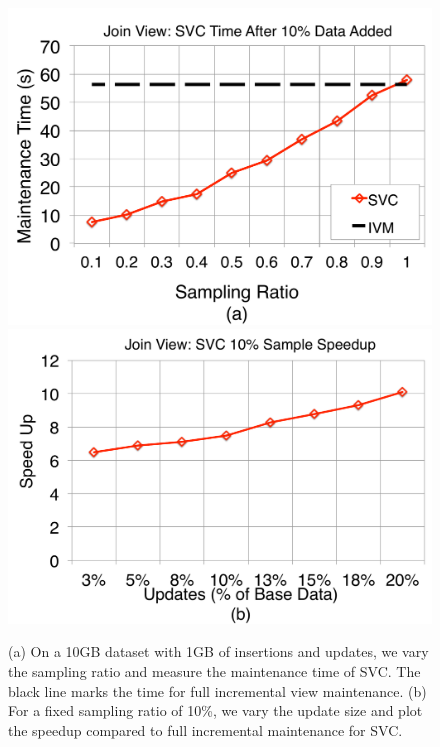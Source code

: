 \begin{figure}[t]\vspace{-2em}
\centering
\includegraphics[scale=0.13]{exp/msj_1.pdf}
\includegraphics[scale=0.13]{exp/msj_2.pdf}\vspace{-1em}
 \caption{(a) On a 10GB dataset with 1GB of insertions and updates, we vary the sampling ratio and measure the maintenance time of SVC. The black line marks the time for full incremental view maintenance. (b) For a fixed sampling ratio of 10\%, we vary the update size and plot the speedup compared to full incremental maintenance for SVC. \vspace{-1em}\label{exp-1-samplesize}}
\end{figure}

